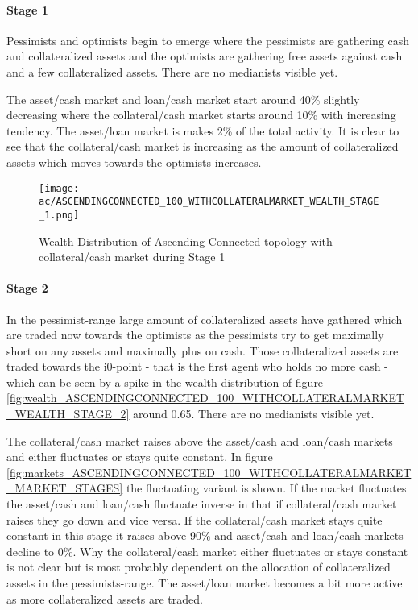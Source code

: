 \documentclass[Bachelorarbeit.tex]{subfiles}
\begin{document}
\paragraph{Stage 1}
Pessimists and optimists begin to emerge where the pessimists are gathering cash and collateralized assets and the optimists are gathering free assets against cash and a few collateralized assets. There are no medianists visible yet.

\medskip

The asset/cash market and loan/cash market start around 40\% slightly decreasing where the collateral/cash market starts around 10\% with increasing tendency. The asset/loan market is makes 2\% of the total activity. It is clear to see that the collateral/cash market is increasing as the amount of collateralized assets which moves towards the optimists increases.
		
\begin{figure}[H]
	\centering
  \texttt{[image: ac/ASCENDINGCONNECTED\_100\_WITHCOLLATERALMARKET\_WEALTH\_STAGE\_1.png]}
  	\caption{Wealth-Distribution of Ascending-Connected topology with collateral/cash market during Stage 1}
	\label{fig:wealth_ASCENDINGCONNECTED_100_WITHCOLLATERALMARKET_WEALTH_STAGE_1}
\end{figure}

\paragraph{Stage 2}
In the pessimist-range large amount of collateralized assets have gathered which are traded now towards the optimists as the pessimists try to get maximally short on any assets and maximally plus on cash. Those collateralized assets are traded towards the i0-point - that is the first agent who holds no more cash - which can be seen by a spike in the wealth-distribution of figure \ref{fig:wealth_ASCENDINGCONNECTED_100_WITHCOLLATERALMARKET_WEALTH_STAGE_2} around 0.65.
There are no medianists visible yet.

\medskip

The collateral/cash market raises above the asset/cash and loan/cash markets and either fluctuates or stays quite constant. In figure \ref{fig:markets_ASCENDINGCONNECTED_100_WITHCOLLATERALMARKET_MARKET_STAGES} the fluctuating variant is shown. If the market fluctuates the asset/cash and loan/cash fluctuate inverse in that if collateral/cash market raises they go down and vice versa. If the collateral/cash market stays quite constant in this stage it raises above 90\% and asset/cash and loan/cash markets decline to 0\%. Why the collateral/cash market either fluctuates or stays constant is not clear but is most probably dependent on the allocation of collateralized assets in the pessimists-range. The asset/loan market becomes a bit more active as more collateralized assets are traded.
		
\end{document}
